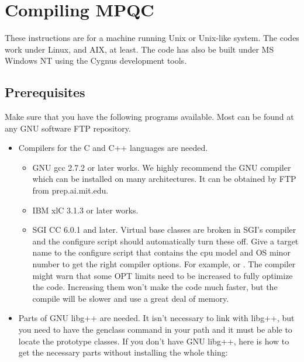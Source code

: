 
\chapter{Compiling MPQC}


These instructions are for a machine running Unix or Unix-like system. The
codes work under Linux, and AIX, at least.  The code has also be built
under MS Windows NT using the Cygnus development tools.

\section{Prerequisites}
 Make sure that you have the following programs available. Most can be
found at any GNU software FTP repository.
  \begin{itemize}

    \item Compilers for the C and C++ languages are needed.
       \begin{itemize}
           \item GNU gcc 2.7.2 or later works.  We highly recommend the GNU
               compiler which can be installed on many architectures.  It
               can be obtained by FTP from prep.ai.mit.edu.

           \item IBM xlC 3.1.3 or later works.

           \item SGI CC 6.0.1 and later.  Virtual base classes are broken
               in SGI's compiler and the configure script should
               automatically turn these off.  Give a target name to
               the configure script that contains the cpu model and
               OS minor number to get the right compiler options.
               For example,  or
               .  The compiler
               might warn that some OPT limits need to be increased
               to fully optimize the code.  Increasing them won't
               make the code much faster, but the compile will be
               slower and use a great deal of memory.

       \end{itemize}

    \item Parts of GNU libg++ are needed.  It isn't necessary to link with
          libg++, but you need to have the genclass command in your path
          and it must be able to locate the prototype classes.  If you
          don't have GNU libg++, here is how to get the necessary parts
          without installing the whole thing:


\end{itemize}
